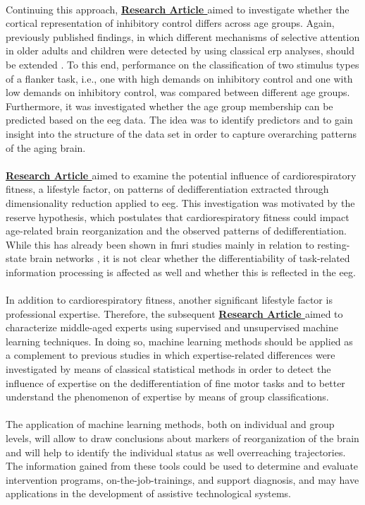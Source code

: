 \\
Continuing this approach, \textbf{\hyperref[pub:paperII]{Research Article }} aimed to investigate whether the cortical representation of inhibitory control differs across age groups. Again, previously published findings, in which different mechanisms of selective attention in older adults and children were detected by using classical \gls{erp} analyses, should be extended \cite{Reuter2019}. To this end, performance on the classification of two stimulus types of a flanker task, i.e., one with high demands on inhibitory control and one with low demands on inhibitory control, was compared between different age groups. Furthermore, it was investigated whether the age group membership can be predicted based on the \gls{eeg} data. The idea was to identify predictors and to gain insight into the structure of the data set in order to capture overarching patterns of the aging brain. \\
\\
\textbf{\hyperref[pub:paperIII]{Research Article }} aimed to examine the potential influence of cardiorespiratory fitness, a lifestyle factor, on patterns of dedifferentiation extracted through dimensionality reduction applied to \gls{eeg}. This investigation was motivated by the reserve hypothesis, which postulates that cardiorespiratory fitness could impact age-related brain reorganization and the observed patterns of dedifferentiation. While this has already been shown in \gls{fmri} studies mainly in relation to resting-state brain networks \cite{Stillman2019}, it is not clear whether the differentiability of task-related information processing is affected as well and whether this is reflected in the \gls{eeg}.\\
\\
In addition to cardiorespiratory fitness, another significant lifestyle factor is professional expertise. Therefore, the subsequent \textbf{\hyperref[pub:paperIV]{Research Article }} aimed to characterize middle-aged experts using supervised and unsupervised machine learning techniques. In doing so, machine learning methods should be applied as a complement to previous studies in which expertise-related differences were investigated by means of classical statistical methods \cite{vieluf2018age, Goelz2018} in order to detect the influence of expertise on the dedifferentiation of fine motor tasks and to better understand the phenomenon of expertise by means of group classifications.\\
\\
The application of machine learning methods, both on individual and group levels, will allow to draw conclusions about markers of reorganization of the brain and will help to identify the individual status as well overreaching trajectories. The information gained from these tools could be used to determine and evaluate intervention programs, on-the-job-trainings, and support diagnosis, and may have applications in the development of assistive technological systems. 